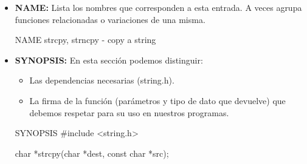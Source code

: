 \documentclass[]{scrartcl}
\begin{document}
\begin{itemize}
  \item \textbf{NAME:} Lista los nombres que corresponden a esta entrada. A veces agrupa funciones relacionadas o variaciones de una misma.
  \begin{bashbox}[]
    NAME
       strcpy, strncpy - copy a string
  \end{bashbox}
  \item \textbf{SYNOPSIS:} En esta sección podemos distinguir:
  \begin{itemize}
    \item Las dependencias necesarias (string.h).
    \item La firma de la función (parámetros y tipo de dato que devuelve) que debemos respetar para su uso en nuestros programas.
  \end{itemize}
  \begin{bashbox}[]
    SYNOPSIS
       #include <string.h>

       char *strcpy(char *dest, const char *src);


\end{bashbox}
\end{itemize}
\end{document}
